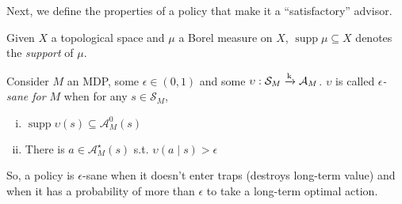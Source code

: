 \documentclass[anon,12pt]{colt2018} %
\DeclareMathOperator{\Supp}{supp}
\newcommand{\AP}[1]{\left(#1\right)}
\newcommand{\K}{\xrightarrow{\textnormal{k}}}
\newcommand{\A}{\mathcal{A}}
\newcommand{\St}{\mathcal{S}}
\newcommand{\Ad}{\upsilon}
\begin{document}
Next, we define the properties of a policy that make it a \enquote{satisfactory} advisor.

Given $X$ a topological space and $\mu$ a Borel measure on $X$, $\Supp{\mu} \subseteq X$ denotes the \emph{support} of $\mu$.

\begin{samepage}
\begin{definition}
\label{def:sane}

Consider $M$ an MDP, some $\epsilon\in(0,1)$ and some $\Ad: \St_M \K \A_M$. $\Ad$ is called \emph{$\epsilon$-sane for $M$} when for any $s \in \St_M$,

\begin{enumerate}[i.]
\item\label{con:def__sane__safe} $\Supp{\Ad(s)} \subseteq \A_M^0\AP{s}$
\item\label{con:def__sane__bold} There is $a \in \A_M^\star(s)$ s.t. $\Ad(a \mid s) > \epsilon$
\end{enumerate}

So, a policy is $\epsilon$-sane when it doesn't enter traps (destroys long-term value) and when it has a probability of more than $\epsilon$ to take a long-term optimal action.

\end{definition}
\end{samepage}
\end{document}
